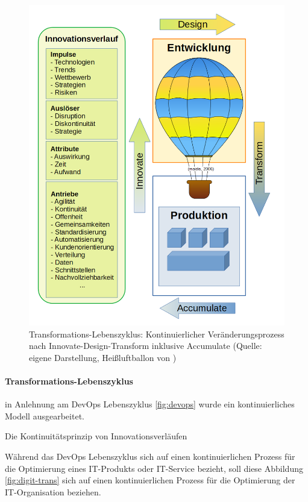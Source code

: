  
 \begin{figure}[htbp]
 \centering
 \includegraphics[width=1.0\textwidth]{gfx/digital-transformation-lifecycle-by-selim4.PNG}
 \caption{Transformations-Lebenszyklus: Kontinuierlicher Veränderungsprozess nach Innovate-Design-Transform inklusive Accumulate (Quelle: eigene Darstellung, Heißluftballon von \citet{maidis_2006})\label{fig:digit-trans-idt}
 }
 \end{figure}
 
 \paragraph{Transformations-Lebenszyklus}


in Anlehnung am DevOps Lebenszyklus \ref{fig:devops} \cite{Alt2017} wurde ein kontinuierliches Modell ausgearbeitet.

Die Kontinuitätsprinzip von Innovationsverläufen \cite{Bussmann2006} 

 Während das DevOps Lebenszyklus \cite{Alt2017} sich auf einen kontinuierlichen Prozess für die Optimierung eines IT-Produkts oder IT-Service bezieht, soll diese Abbildung \ref{fig:digit-trans} sich auf einen kontinuierlichen Prozess für die Optimierung der IT-Organisation beziehen.
 
